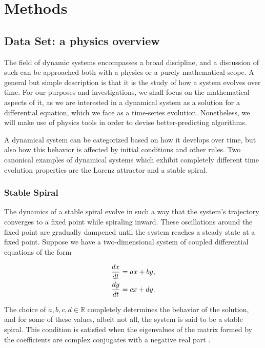 \section{Methods}\label{methods}

\subsection{Data Set: a physics overview}\label{sec:data}

The field of dynamic systems encompasses a broad discipline, and a discussion of such can be approached both with a physics or a purely mathematical scope. A general but simple description is that it is the study of how a system evolves over time. For our purposes and investigations, we shall focus on the mathematical aspects of it, as we are interested in a dynamical system as a solution for a differential equation, which we face as a time-series evolution. Nonetheless, we will make use of physics tools in order to devise better-predicting algorithms.

A dynamical system can be categorized based on how it develops over time, but also how this behavior is affected by initial conditions and other rules. Two canonical examples of dynamical systems which exhibit completely different time evolution properties are the Lorenz attractor and a stable spiral.

\subsubsection{Stable Spiral}\label{sec:spiral}

The dynamics of a stable spiral evolve in such a way that the system's trajectory converges to a fixed point while spiraling inward. These oscillations around the fixed point are gradually dampened until the system reaches a steady state at a fixed point.
Suppose we have a two-dimensional system of coupled differential equations of the form

\begin{align}
    \frac{dx}{dt} &= ax + by \notag,\\
    \frac{dy}{dt} &= cx + dy.
    \label{eq:spiral}
\end{align}

The choice of $a,b,c,d \in \mathbb{R}$ completely determines the behavior of the solution, and for some of these values, albeit not all, the system is said to be a stable spiral. This condition is satisfied when the eigenvalues of the matrix formed by the coefficients are complex conjugates with a negative real part \cite{abell2022chapter6}. 

